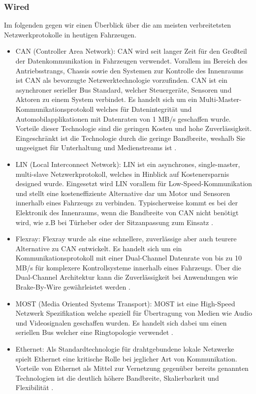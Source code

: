         \subsubsection{Wired}
        Im folgenden gegen wir einen Überblick über die am meisten verbreitetsten Netzwerkprotokolle in heutigen Fahrzeugen. 
            \begin{itemize}
                \item CAN (Controller Area Network): CAN wird seit langer Zeit für den Großteil der Datenkommunikation in Fahrzeugen verwendet.
                Vorallem im Bereich des Antriebsstrangs, Chassis sowie den Systemen zur Kontrolle des Innenraums ist CAN als bevorzugte Netzwerktechnologie vorzufinden.
                CAN ist ein asynchroner serieller Bus Standard, welcher Steuergeräte, Sensoren und Aktoren zu einem System verbindet. Es handelt sich um ein 
                Multi-Master-Kommunikationsprotokoll welches für Datenintegrität und Automobilapplikationen mit Datenraten von 1 MB/s geschaffen wurde. Vorteile
                dieser Technologie sind die geringen Kosten und hohe Zuverlässigkeit. Eingeschränkt ist die Technologie durch die geringe Bandbreite, weshalb Sie
                ungeeignet für Unterhaltung und Medienstreams ist \cite{IVN}.
                \item LIN (Local Interconnect Network): LIN ist ein asynchrones, single-master, multi-slave Netzwerkprotokoll, welches in Hinblick auf Kostenersparnis 
                designed wurde. Eingesetzt wird LIN vorallem für Low-Speed-Kommunikation und stellt eine kosteneffiziente Alternative dar um Motor und Sensoren innerhalb 
                eines Fahrzeugs zu verbinden. Typischerweise kommt es bei der Elektronik des Innenraums, wenn die Bandbreite von CAN nicht benötigt wird, wie z.B bei Türheber
                oder der Sitzanpassung zum Einsatz \cite{IVN}.
                \item Flexray: Flexray wurde als eine schnellere, zuverlässige aber auch teurere Alternative zu CAN entwickelt. Es handelt sich um ein Kommunikationsprotokoll mit einer
                Dual-Channel Datenrate von bis zu 10 MB/s für komplexere Kontrollsysteme innerhalb eines Fahrzeugs. Über die Dual-Channel Architektur kann die Zuverlässigkeit
                bei Anwendungen wie Brake-By-Wire gewährleistet werden \cite{IVN}. 
                \item MOST (Media Oriented Systems Transport): MOST ist eine High-Speed Netzwerk Spezifikation welche speziell für Übertragung von Medien wie Audio und Videosignalen 
                geschaffen wurden. Es handelt sich dabei um einen seriellen Bus welcher eine Ringtopologie verwendet \cite{IVN}.
                \item Ethernet: Als Standardtechnologie für drahtgebundene lokale Netzwerke spielt Ethernet eine kritische Rolle bei jeglicher Art von Kommunikation.
                Vorteile von Ethernet als Mittel zur Vernetzung gegenüber bereits genannten Technologien ist die deutlich höhere Bandbreite, Skalierbarkeit und Flexibilität \cite{IVN}. 
            \end{itemize}
